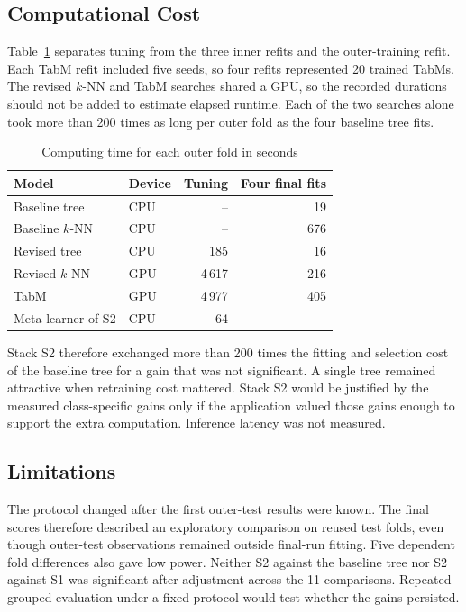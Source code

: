 \documentclass[conference]{IEEEtran}
\newcommand{\knn}{\mbox{$k$-NN}}
\begin{document}
\subsection{Computational Cost}
Table~\ref{tab:cost} separates tuning from the three inner refits and the outer-training refit. Each TabM refit included five seeds, so four refits represented 20 trained TabMs. The revised \knn{} and TabM searches shared a GPU, so the recorded durations should not be added to estimate elapsed runtime. Each of the two searches alone took more than 200 times as long per outer fold as the four baseline tree fits.

\begin{table}[!t]
    \caption{Computing time for each outer fold in seconds}
    \label{tab:cost}
    \centering\footnotesize
    \begin{tabular}{@{}llrr@{}}
        \toprule
        Model                 & Device & Tuning   & Four final fits \\
        \midrule
        Baseline tree         & CPU    & --       & 19              \\
        Baseline \knn         & CPU    & --       & 676             \\
        Revised tree          & CPU    & 185      & 16              \\
        Revised \knn          & GPU    & 4\,617   & 216             \\
        TabM                  & GPU    & 4\,977   & 405             \\
        Meta-learner of S2    & CPU    & 64       & --              \\
        \bottomrule
    \end{tabular}
\end{table}

Stack S2 therefore exchanged more than 200 times the fitting and selection cost of the baseline tree for a gain that was not significant. A single tree remained attractive when retraining cost mattered. Stack S2 would be justified by the measured class-specific gains only if the application valued those gains enough to support the extra computation. Inference latency was not measured.

\subsection{Limitations}
The protocol changed after the first outer-test results were known. The final scores therefore described an exploratory comparison on reused test folds, even though outer-test observations remained outside final-run fitting. Five dependent fold differences also gave low power. Neither S2 against the baseline tree nor S2 against S1 was significant after adjustment across the 11 comparisons. Repeated grouped evaluation under a fixed protocol would test whether the gains persisted.
\end{document}
